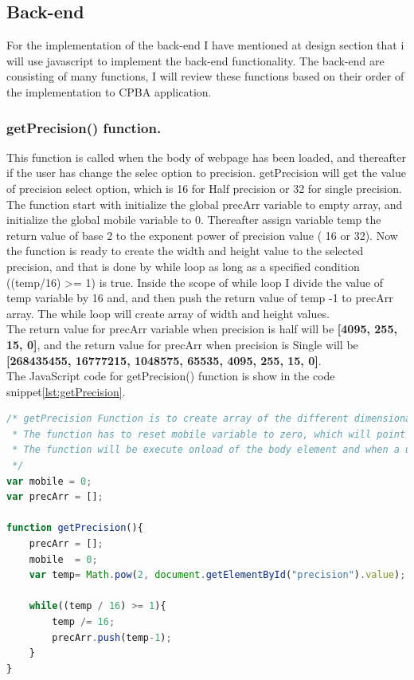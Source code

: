 \documentclass[11pt]{article}
\begin{document}
\subsection{Back-end}
For the implementation of the back-end I have mentioned at design section that i will use javascript to implement the back-end functionality. The back-end are consisting of many functions, I will review these functions based on their order of the implementation to CPBA application.
\subsubsection{getPrecision() function.}
This function is called when the body of webpage has been loaded, and thereafter if the user has change the selec option to precision. getPrecision will get the value of precision select option, which is 16 for Half precision  or 32 for single precision. The function start with initialize the global precArr variable to empty array, and initialize the global mobile variable to 0. Thereafter assign variable temp the return value of base 2 to the exponent power of precision value ( 16 or 32).
Now the function is ready to create the width and height value to the selected precision, and that is done by while loop as long as a specified condition ((temp/16) >= 1) is true. Inside the scope of while loop I divide the value of temp variable by 16 and, and then push the return value of temp -1 to precArr array. The while loop will create array of width and height values.\\

The return value for precArr variable when precision is half will be \textbf{[4095, 255, 15, 0]}, and the return value for precArr when precision is Single will be \textbf{[268435455, 16777215, 1048575, 65535, 4095, 255, 15, 0]}.\\
The JavaScript code for getPrecision() function is show in the code snippet\ref{lst:getPrecision}.\\
\begin{lstlisting}[label={lst:getPrecision}, language=Javascript, caption={getPrecision function},]
/* getPrecision Function is to create array of the different dimensional to chart.
 * The function has to reset mobile variable to zero, which will point to the start of precArr.
 * The function will be execute onload of the body element and when a user changes the selected option of a <select> element.
 */
var mobile = 0;
var precArr = [];

function getPrecision(){
	precArr = [];
	mobile  = 0;
	var temp= Math.pow(2, document.getElementById("precision").value);

	while((temp / 16) >= 1){
		temp /= 16;
		precArr.push(temp-1); 
	}
}
\end{lstlisting}
\end{document}
